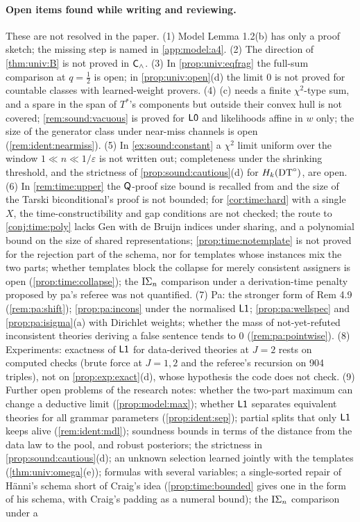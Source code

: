 \paragraph{Open items found while writing and reviewing.}\label{app:ver:open}
These are not resolved in the paper. (1) Model Lemma 1.2(b) has only a proof sketch; the missing step is named in \cref{app:model:a4}. (2) The direction of \cref{thm:univ:B} is not proved in $\mathsf{C}_{\wedge}$. (3) In \cref{prop:univ:eqfrag} the full-sum comparison at $q=\frac12$ is open; in \cref{prop:univ:open}(d) the limit $0$ is not proved for countable classes with learned-weight provers. (4) (c) needs a finite $\chi^2$-type sum, and a spare in the span of $T^*$'s components but outside their convex hull is not covered; \cref{rem:sound:vacuous} is proved for $\mathord{\mathsf{L0}}$ and likelihoods affine in $w$ only; the size of the generator class under near-miss channels is open (\cref{rem:ident:nearmiss}). (5) In \cref{ex:sound:constant} a $\chi^2$ limit uniform over the window $1\ll n\ll1/\varepsilon$ is not written out; completeness under the shrinking threshold, and the strictness of \cref{prop:sound:cautious}(d) for $H_{k}(\mathrm{DT}^{\circ})$, are open. (6) In \cref{rem:time:upper} the $\mathsf{Q}$-proof size bound is recalled from \citet{pudlak1998lengths} and the size of the Tarski biconditional's proof is not bounded; for \cref{cor:time:hard} with a single $X$, the time-constructibility and gap conditions are not checked; the route to \cref{conj:time:poly} lacks Gen with de Bruijn indices under sharing, and a polynomial bound on the size of shared representations; \cref{prop:time:notemplate} is not proved for the rejection part of the schema, nor for templates whose instances mix the two parts; whether templates block the collapse for merely consistent assigners is open (\cref{prop:time:collapse}); the $\mathrm{I}\Sigma_{n}$ comparison under a derivation-time penalty proposed by pa's referee was not quantified. (7) Pa: the stronger form of Rem 4.9 (\cref{rem:pa:shift}); \cref{prop:pa:incons} under the normalised $\mathord{\mathsf{L1}}$; \cref{prop:pa:wellspec} and \cref{prop:pa:isigma}(a) with Dirichlet weights; whether the mass of not-yet-refuted inconsistent theories deriving a false sentence tends to $0$ (\cref{rem:pa:pointwise}). (8) Experiments: exactness of $\mathord{\mathsf{L1}}$ for data-derived theories at $J=2$ rests on computed checks (brute force at $J=1,2$ and the referee's recursion on 904 triples), not on \cref{prop:exp:exact}(d), whose hypothesis the code does not check. (9) Further open problems of the research notes: whether the two-part maximum can change a deductive limit (\cref{prop:model:max}); whether $\mathord{\mathsf{L1}}$ separates equivalent theories for all grammar parameters (\cref{prop:ident:sep}); partial splits that only $\mathord{\mathsf{L1}}$ keeps alive (\cref{rem:ident:mdl}); soundness bounds in terms of the distance from the data law to the pool, and robust posteriors; the strictness in \cref{prop:sound:cautious}(d); an unknown selection learned jointly with the templates (\cref{thm:univ:omega}(e)); formulas with several variables; a single-sorted repair of H\"anni's schema short of Craig's idea (\cref{prop:time:bounded} gives one in the form of his schema, with Craig's padding as a numeral bound); the $\mathrm{I}\Sigma_{n}$ comparison under a 